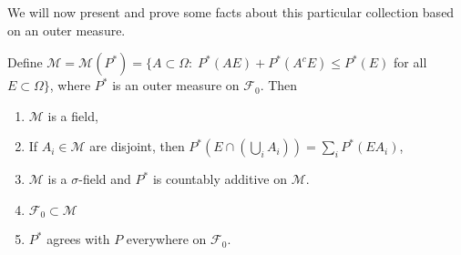 \documentclass[11pt,fleqn]{book} %
\begin{document}
We will now present and prove some facts about this particular collection based on an outer measure.

\begin{theorem} \label{thm:1.3}
	Define $\mathcal{M} = \mathcal{M}(P^*) = \{A \subset \Omega:\;P^*(AE)+P^*(A^cE) \leq P^*(E)$ for all $E \subset \Omega\}$, where $P^*$ is an outer measure on $\mathcal{F}_0$. Then
	\begin{enumerate}[label=(\alph*)]
		\item $\mathcal{M}$ is a field,
		\item If $A_i \in \mathcal{M}$ are disjoint, then $P^*(E \cap (\bigcup_i A_i)) = \sum_i P^*(EA_i)$,
		\item $\mathcal{M}$ is a $\sigma$-field and $P^*$ is countably additive on $\mathcal{M}$.
		\item $\mathcal{F}_0 \subset \mathcal{M}$
		\item $P^*$ agrees with $P$ everywhere on $\mathcal{F}_0$.
	\end{enumerate}
\end{theorem}
\end{document}
